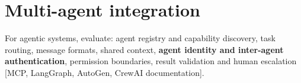 \section{Multi-agent integration}

For agentic systems, evaluate: agent registry and capability discovery, task
routing, message formats, shared context, \textbf{agent identity and
inter-agent authentication}, permission boundaries, result validation and
human escalation [MCP, LangGraph, AutoGen, CrewAI documentation].

